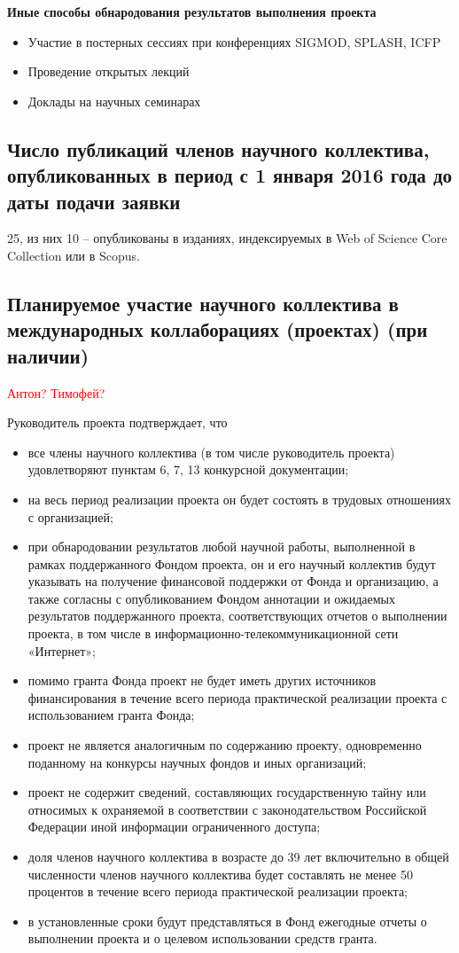 \documentclass[12pt]{article}  %
\theoremstyle{remark}
\newcommand{\checkme}[1]{\textcolor{red}{#1}}
\begin{document}
\textbf{Иные способы обнародования результатов выполнения проекта}
\begin{itemize}
\item Участие в постерных сессиях при конференциях SIGMOD, SPLASH, ICFP
\item Проведение открытых лекций
\item Доклады на научных семинарах
\end{itemize}

\subsection{Число публикаций членов научного коллектива, опубликованных в период с 1 января 2016 года до даты подачи заявки}

25, из них 10 – опубликованы в изданиях, индексируемых в Web of Science Core Collection или в Scopus.

\subsection{Планируемое участие научного коллектива в международных коллаборациях (проектах) (при наличии)}

\checkme{Антон? Тимофей?}

\vline
Руководитель проекта подтверждает, что
\begin{itemize}
\item все члены научного коллектива (в том числе руководитель проекта) удовлетворяют пунктам 6, 7, 13 конкурсной документации;
\item на весь период реализации проекта он будет состоять в трудовых отношениях с организацией;
\item при обнародовании результатов любой научной работы, выполненной в рамках поддержанного Фондом проекта, он и его научный коллектив будут указывать на получение финансовой поддержки от Фонда и организацию, а также согласны с опубликованием Фондом аннотации и ожидаемых результатов поддержанного проекта, соответствующих отчетов о выполнении проекта, в том числе в информационно-телекоммуникационной сети «Интернет»;
\item помимо гранта Фонда проект не будет иметь других источников финансирования в течение всего периода практической реализации проекта с использованием гранта Фонда;
\item проект не является аналогичным по содержанию проекту, одновременно поданному на конкурсы научных фондов и иных организаций;
\item проект не содержит сведений, составляющих государственную тайну или относимых к охраняемой в соответствии с законодательством Российской Федерации иной информации ограниченного доступа;
\item доля членов научного коллектива в возрасте до 39 лет включительно в общей численности членов научного коллектива будет составлять не менее 50 процентов в течение всего периода практической реализации проекта;
\item в установленные сроки будут представляться в Фонд ежегодные отчеты о выполнении проекта и о целевом использовании средств гранта.
\end{itemize}
\end{document}

